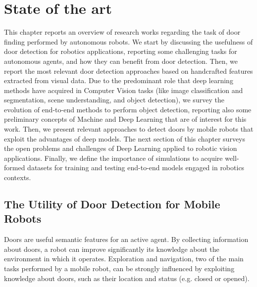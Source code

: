 \chapter{State of the art}
\label{sec:chapter2}
\thispagestyle{empty}

 This chapter reports an overview of research works regarding the task of door finding performed by autonomous robots. We start by discussing the usefulness of door detection for robotics applications, reporting some challenging tasks for autonomous agents, and how they can benefit from door detection. Then, we report the most relevant door detection approaches based on handcrafted features extracted from visual data. Due to the predominant role that deep learning methods have acquired in Computer Vision tasks (like image classification and segmentation, scene understanding, and object detection), we survey the evolution of end-to-end methods to perform object detection, reporting also some preliminary concepts of Machine and Deep Learning that are of interest for this work. Then, we present relevant approaches to detect doors by mobile robots that exploit the advantages of deep models. The next section of this chapter surveys the open problems and challenges of Deep Learning applied to robotic vision applications. Finally, we define the importance of simulations to acquire well-formed datasets for training and testing end-to-end models engaged in robotics contexts.  
 
 \section{The Utility of Door Detection for Mobile Robots}
 
 Doors are useful semantic features for an active agent. By collecting information about doors, a robot can improve significantly its knowledge about the environment in which it operates. Exploration and navigation, two of the main tasks performed by a mobile robot, can be strongly influenced by exploiting knowledge about doors, such as their location and status (e.g. closed or opened). 
 
